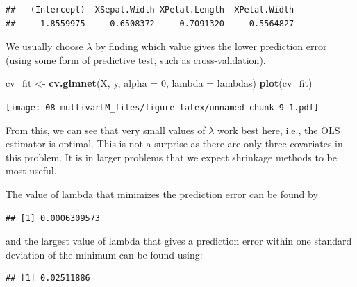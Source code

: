 \documentclass[
]{book}
\newenvironment{Shaded}{\begin{snugshade}}{\end{snugshade}}
\newcommand{\AttributeTok}[1]{\textcolor[rgb]{0.13,0.29,0.53}{#1}}
\newcommand{\DecValTok}[1]{\textcolor[rgb]{0.00,0.00,0.81}{#1}}
\newcommand{\FloatTok}[1]{\textcolor[rgb]{0.00,0.00,0.81}{#1}}
\newcommand{\FunctionTok}[1]{\textcolor[rgb]{0.13,0.29,0.53}{\textbf{#1}}}
\newcommand{\NormalTok}[1]{#1}
\newcommand{\OtherTok}[1]{\textcolor[rgb]{0.56,0.35,0.01}{#1}}
\newcommand{\SpecialCharTok}[1]{\textcolor[rgb]{0.81,0.36,0.00}{\textbf{#1}}}
\theoremstyle{definition}
\theoremstyle{definition}
\theoremstyle{definition}
\theoremstyle{definition}
\theoremstyle{remark}
\begin{document}
\begin{verbatim}
##   (Intercept)  XSepal.Width XPetal.Length  XPetal.Width 
##     1.8559975     0.6508372     0.7091320    -0.5564827
\end{verbatim}

We usually choose \(\lambda\) by finding which value gives the lower prediction error (using some form of predictive test, such as cross-validation).

\begin{Shaded}
\begin{Highlighting}[]
\NormalTok{cv\_fit }\OtherTok{\textless{}{-}} \FunctionTok{cv.glmnet}\NormalTok{(X, y, }\AttributeTok{alpha =} \DecValTok{0}\NormalTok{, }\AttributeTok{lambda =}\NormalTok{ lambdas)}
\FunctionTok{plot}\NormalTok{(cv\_fit)}
\end{Highlighting}
\end{Shaded}

\texttt{[image: 08-multivarLM\_files/figure-latex/unnamed-chunk-9-1.pdf]}

From this, we can see that very small values of \(\lambda\) work best here, i.e., the OLS estimator is optimal. This is not a surprise as there are only three covariates in this problem. It is in larger problems that we expect shrinkage methods to be most useful.

The value of lambda that minimizes the prediction error can be found by

\begin{Shaded}
\end{Shaded}

\begin{verbatim}
## [1] 0.0006309573
\end{verbatim}

and the largest value of lambda that gives a prediction error within one standard deviation of the minimum can be found using:

\begin{Shaded}
\end{Shaded}

\begin{verbatim}
## [1] 0.02511886
\end{verbatim}
\end{document}
